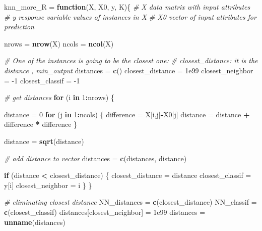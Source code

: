 \documentclass[]{article}
\newenvironment{Shaded}{\begin{snugshade}}{\end{snugshade}}
\newcommand{\CommentTok}[1]{\textcolor[rgb]{0.56,0.35,0.01}{\textit{#1}}}
\newcommand{\ControlFlowTok}[1]{\textcolor[rgb]{0.13,0.29,0.53}{\textbf{#1}}}
\newcommand{\DecValTok}[1]{\textcolor[rgb]{0.00,0.00,0.81}{#1}}
\newcommand{\FloatTok}[1]{\textcolor[rgb]{0.00,0.00,0.81}{#1}}
\newcommand{\KeywordTok}[1]{\textcolor[rgb]{0.13,0.29,0.53}{\textbf{#1}}}
\newcommand{\NormalTok}[1]{#1}
\newcommand{\OperatorTok}[1]{\textcolor[rgb]{0.81,0.36,0.00}{\textbf{#1}}}
\newcommand{\StringTok}[1]{\textcolor[rgb]{0.31,0.60,0.02}{#1}}
\begin{document}
\begin{Shaded}
\begin{Highlighting}[]
\NormalTok{knn_more_R =}\StringTok{ }\ControlFlowTok{function}\NormalTok{(X, X0, y, K)\{}
  \CommentTok{# X data matrix with input attributes}
  \CommentTok{# y response variable values of instances in X  }
  \CommentTok{# X0 vector of input attributes for prediction}
  
\NormalTok{  nrows =}\StringTok{ }\KeywordTok{nrow}\NormalTok{(X)}
\NormalTok{  ncols =}\StringTok{ }\KeywordTok{ncol}\NormalTok{(X)}
  
  \CommentTok{# One of the instances is going to be the closest one:}
  \CommentTok{# closest_distance: it is the distance , min_output}
\NormalTok{  distances =}\StringTok{ }\KeywordTok{c}\NormalTok{()}
\NormalTok{  closest_distance =}\StringTok{ }\FloatTok{1e99}
\NormalTok{  closest_neighbor =}\StringTok{ }\DecValTok{-1}
\NormalTok{  closest_classif =}\StringTok{ }\DecValTok{-1}
  
  \CommentTok{# get distances}
  \ControlFlowTok{for}\NormalTok{ (i }\ControlFlowTok{in} \DecValTok{1}\OperatorTok{:}\NormalTok{nrows) \{}

\NormalTok{    distance =}\StringTok{ }\DecValTok{0}
    \ControlFlowTok{for}\NormalTok{ (j }\ControlFlowTok{in} \DecValTok{1}\OperatorTok{:}\NormalTok{ncols) \{}
\NormalTok{      difference =}\StringTok{ }\NormalTok{X[i,j]}\OperatorTok{-}\NormalTok{X0[j]}
\NormalTok{      distance =}\StringTok{ }\NormalTok{distance }\OperatorTok{+}\StringTok{ }\NormalTok{difference }\OperatorTok{*}\StringTok{ }\NormalTok{difference}
\NormalTok{    \}}
    
\NormalTok{    distance =}\StringTok{ }\KeywordTok{sqrt}\NormalTok{(distance)}

    \CommentTok{# add distance to vector}
\NormalTok{    distances =}\StringTok{ }\KeywordTok{c}\NormalTok{(distances, distance)}

    \ControlFlowTok{if}\NormalTok{ (distance }\OperatorTok{<}\StringTok{ }\NormalTok{closest_distance) \{}
\NormalTok{      closest_distance =}\StringTok{ }\NormalTok{distance}
\NormalTok{      closest_classif =}\StringTok{ }\NormalTok{y[i]}
\NormalTok{      closest_neighbor =}\StringTok{ }\NormalTok{i}
\NormalTok{    \}}
\NormalTok{  \}}

  \CommentTok{# eliminating closest distance}
\NormalTok{  NN_distances =}\StringTok{ }\KeywordTok{c}\NormalTok{(closest_distance)}
\NormalTok{  NN_classif =}\StringTok{ }\KeywordTok{c}\NormalTok{(closest_classif)}
\NormalTok{  distances[closest_neighbor] =}\StringTok{ }\FloatTok{1e99}
\NormalTok{  distances =}\StringTok{ }\KeywordTok{unname}\NormalTok{(distances)}


\end{Highlighting}
\end{Shaded}
\end{document}
